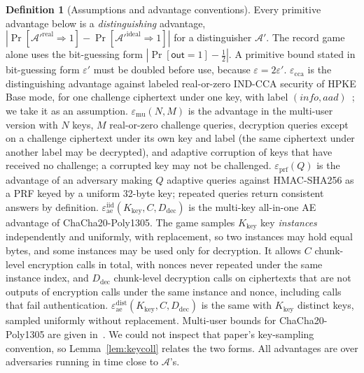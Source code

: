 \documentclass[pdflatex,sn-mathphys-num]{sn-jnl}%
\theoremstyle{plain}
\theoremstyle{definition}
\newtheorem{definition}[theorem]{Definition}
\begin{document}
\begin{definition}[Assumptions and advantage conventions]\label{def:assumptions}
Every primitive advantage below is a \emph{distinguishing} advantage, $|\Pr[\mathcal A'^{\mathrm{real}}\Rightarrow1]-\Pr[\mathcal A'^{\mathrm{ideal}}\Rightarrow1]|$ for a distinguisher $\mathcal A'$. The record game alone uses the bit-guessing form $|\Pr[\mathsf{out}=1]-\tfrac12|$. A primitive bound stated in bit-guessing form $\varepsilon'$ must be doubled before use, because $\varepsilon=2\varepsilon'$.
$\varepsilon_{\mathrm{cca}}$ is the distinguishing advantage against labeled real-or-zero IND-CCA security of HPKE Base mode, for one challenge ciphertext under one key, with label $(\mathit{info},\mathit{aad})$~\cite{rfc9180}; we take it as an assumption. $\varepsilon_{\mathrm{mu}}(N,M)$ is the advantage in the multi-user version with $N$ keys, $M$ real-or-zero challenge queries, decryption queries except on a challenge ciphertext under its own key and label (the same ciphertext under another label may be decrypted), and adaptive corruption of keys that have received no challenge; a corrupted key may not be challenged. $\varepsilon_{\mathrm{prf}}(Q)$ is the advantage of an adversary making $Q$ adaptive queries against HMAC-SHA256 as a PRF keyed by a uniform 32-byte key; repeated queries return consistent answers by definition. $\varepsilon^{\mathrm{iid}}_{\mathrm{ae}}(K_{\mathrm{key}},C,D_{\mathrm{dec}})$ is the multi-key all-in-one AE advantage of ChaCha20-Poly1305. The game samples $K_{\mathrm{key}}$ key \emph{instances} independently and uniformly, with replacement, so two instances may hold equal bytes, and some instances may be used only for decryption. It allows $C$ chunk-level encryption calls in total, with nonces never repeated under the same instance index, and $D_{\mathrm{dec}}$ chunk-level decryption calls on ciphertexts that are not outputs of encryption calls under the same instance and nonce, including calls that fail authentication. $\varepsilon^{\mathrm{dist}}_{\mathrm{ae}}(K_{\mathrm{key}},C,D_{\mathrm{dec}})$ is the same with $K_{\mathrm{key}}$ distinct keys, sampled uniformly without replacement. Multi-user bounds for ChaCha20-Poly1305 are given in~\cite{degabriele2021}. We could not inspect that paper's key-sampling convention, so Lemma~\ref{lem:keycoll} relates the two forms. All advantages are over adversaries running in time close to $\mathcal A$'s.
\end{definition}
\end{document}
